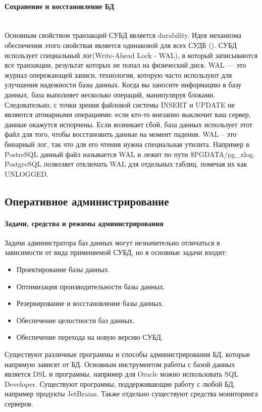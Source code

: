 \paragraph{Сохранение и восстановление БД}~\\
Основным свойством транзакций СУБД является durability. Идея механизма обеспечения этого свойствая является одинаковой для всех СУДБ (\autocite{PostrgreSQL1}). СУБД использует специальный лог(Write-Ahead Lock - WAL), в который записываются все транзакции, результат которых не попал на физический диск. WAL — это журнал опережающей записи, технология, которую часто используют для улучшения надежности базы данных. Когда вы заносите информацию в базу данных, база выполняет несколько операций, манипулируя блоками.
Следовательно, с точки зрения файловой системы INSERT и UPDATE не являются атомарными операциями: если кто-то внезапно выключит ваш сервер, данные окажутся испорчены. Если возникает сбой, база данных использует этот файл для того, чтобы восстановить данные на момент падения. WAL -- это бинарный лог, так что для его чтения нужна специальная утилита.
Например в PostreSQL данный файл называется WAL и лежит по пути \$PGDATA/pg\_xlog. 
PostgreSQL позволяет отключать WAL для отдельных таблиц, помечая их как UNLOGGED.

\subsection{Оперативное администрирование}
\paragraph{Задачи, средства и режимы администрирования}

Задачи администратора баз данных могут незначительно отличаться в зависимости от вида применяемой СУБД, но в основные задачи входит:
\begin{itemize}
    \item Проектирование базы данных.
    \item Оптимизация производительности базы данных.
    \item Резервирование и восстановление базы данных.
    \item Обеспечение целостности баз данных.
    \item Обеспечение перехода на новую версию СУБД.
\end{itemize}
Существуют различные программы и способы администрирования БД, которые напрямую зависят от БД. Основным инструментом работы с базой данных является DSL и программы, например для Oracle можно использовать SQL Developer. Существуют программы, поддерживающие работу с любой БД, например продукты JetBrains.  Также отдельно существуют средства мониторинга серверов. 
